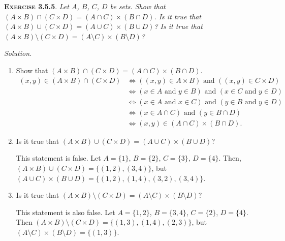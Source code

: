 \documentclass[12pt]{article}
\theoremstyle{remark}
\newenvironment{exer}[2]{
    \noindent \setlength{\parskip}{1em}%
    \textsc{\textbf{Exercise #1}}. \textit{#2} \par
    \noindent \textit{Solution.} %
}{\bigskip}
\begin{document}
\begin{exer}{3.5.5}{
    Let $A$, $B$, $C$, $D$ be sets.
    Show that $(A \times B) \cap (C \times D) = (A \cap C) \times (B \cap D)$.
    Is it true that $(A \times B) \cup (C \times D) = (A \cup C) \times (B \cup D)$?
    Is it true that $(A \times B) \setminus (C \times D) = (A \setminus C) \times (B \setminus D)$?
}
    \begin{enumerate}[topsep=0mm,label=(\alph*)]
        \item Show that $(A \times B) \cap (C \times D) = (A \cap C) \times (B \cap D)$.
            \begin{align*}
                (x, y) \in (A \times B) \cap (C \times D)
                & \iff ((x, y) \in A \times B) \text{ and } ((x, y) \in C \times D) \\
                & \iff (x \in A \text{ and } y \in B) \text{ and } (x \in C \text{ and } y \in D) \\
                & \iff (x \in A \text{ and } x \in C) \text{ and } (y \in B \text{ and } y \in D) \\
                & \iff (x \in A \cap C) \text{ and } (y \in B \cap D) \\
                & \iff (x, y) \in (A \cap C) \times (B \cap D).
            \end{align*}
            
        \item Is it true that $(A \times B) \cup (C \times D) = (A \cup C) \times (B \cup D)$?
        
            This statement is false.
            Let $A = \{ 1 \}$, $B = \{ 2 \}$, $C = \{ 3 \}$, $D = \{ 4 \}$.
            Then, $(A \times B) \cup (C \times D) = \{(1, 2), (3, 4)\}$, but $(A \cup C) \times (B \cup D) = \{(1, 2), (1, 4), (3, 2), (3, 4)\}$.
            
        \item Is it true that $(A \times B) \setminus (C \times D) = (A \setminus C) \times (B \setminus D)$?
        
            This statement is also false.
            Let $A = \{ 1, 2 \}$, $B = \{ 3, 4 \}$, $C = \{ 2 \}$, $D = \{ 4 \}$.
            Then $(A \times B) \setminus (C \times D) = \{(1, 3), (1, 4), (2, 3)\}$, but $(A \setminus C) \times (B \setminus D) = \{(1, 3)\}$.
    \end{enumerate}
\end{exer}
\end{document}
